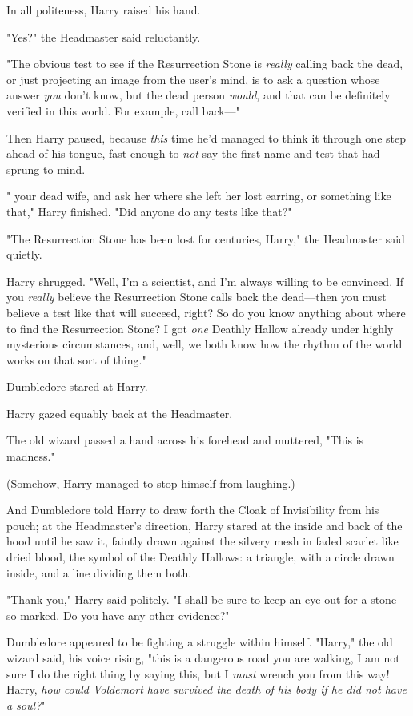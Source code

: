 In all politeness, Harry raised his hand.

"Yes?" the Headmaster said reluctantly.

"The obvious test to see if the Resurrection Stone is \emph{really} calling
back the dead, or just projecting an image from the user's mind, is to ask a
question whose answer \emph{you} don't know, but the dead person \emph{would},
and that can be definitely verified in this world. For example, call back\mbox{---}"

Then Harry paused, because \emph{this} time he'd managed to think it through
one step ahead of his tongue, fast enough to \emph{not} say the first name and
test that had sprung to mind.

"{\el} your dead wife, and ask her where she left her lost earring, or
something like that," Harry finished. "Did anyone do any tests like that?"

"The Resurrection Stone has been lost for centuries, Harry," the Headmaster
said quietly.

Harry shrugged. "Well, I'm a scientist, and I'm always willing to be convinced.
If you \emph{really} believe the Resurrection Stone calls back the dead---then
you must believe a test like that will succeed, right? So do you know anything
about where to find the Resurrection Stone? I got \emph{one} Deathly Hallow
already under highly mysterious circumstances, and, well, we both know how the
rhythm of the world works on that sort of thing."

Dumbledore stared at Harry.

Harry gazed equably back at the Headmaster.

The old wizard passed a hand across his forehead and muttered, "This is
madness."

(Somehow, Harry managed to stop himself from laughing.)

And Dumbledore told Harry to draw forth the Cloak of Invisibility from his
pouch; at the Headmaster's direction, Harry stared at the inside and back of
the hood until he saw it, faintly drawn against the silvery mesh in faded
scarlet like dried blood, the symbol of the Deathly Hallows: a triangle, with a
circle drawn inside, and a line dividing them both.

"Thank you," Harry said politely. "I shall be sure to keep an eye out for a
stone so marked. Do you have any other evidence?"

Dumbledore appeared to be fighting a struggle within himself. "Harry," the old
wizard said, his voice rising, "this is a dangerous road you are walking, I am
not sure I do the right thing by saying this, but I \emph{must} wrench you from
this way! Harry, \emph{how could Voldemort have survived the death of his body
if he did not have a soul?}"

